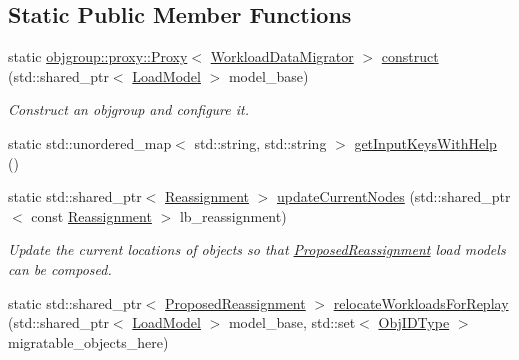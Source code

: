 \subsection*{Static Public Member Functions}
\begin{DoxyCompactItemize}
\item 
static \hyperlink{structvt_1_1objgroup_1_1proxy_1_1_proxy}{objgroup\+::proxy\+::\+Proxy}$<$ \hyperlink{structvt_1_1vrt_1_1collection_1_1balance_1_1replay_1_1_workload_data_migrator}{Workload\+Data\+Migrator} $>$ \hyperlink{structvt_1_1vrt_1_1collection_1_1balance_1_1replay_1_1_workload_data_migrator_abd44b5b51e806fadd7062bc3f482bc71}{construct} (std\+::shared\+\_\+ptr$<$ \hyperlink{structvt_1_1vrt_1_1collection_1_1balance_1_1_load_model}{Load\+Model} $>$ model\+\_\+base)
\begin{DoxyCompactList}\small\item\em Construct an objgroup and configure it. \end{DoxyCompactList}\item 
static std\+::unordered\+\_\+map$<$ std\+::string, std\+::string $>$ \hyperlink{structvt_1_1vrt_1_1collection_1_1balance_1_1replay_1_1_workload_data_migrator_afcd4cf35769f3ded24436957763921b4}{get\+Input\+Keys\+With\+Help} ()
\item 
static std\+::shared\+\_\+ptr$<$ \hyperlink{structvt_1_1vrt_1_1collection_1_1balance_1_1_reassignment}{Reassignment} $>$ \hyperlink{structvt_1_1vrt_1_1collection_1_1balance_1_1replay_1_1_workload_data_migrator_a1bfb98f8073924f31127b5b98855951b}{update\+Current\+Nodes} (std\+::shared\+\_\+ptr$<$ const \hyperlink{structvt_1_1vrt_1_1collection_1_1balance_1_1_reassignment}{Reassignment} $>$ lb\+\_\+reassignment)
\begin{DoxyCompactList}\small\item\em Update the current locations of objects so that \hyperlink{structvt_1_1vrt_1_1collection_1_1balance_1_1_proposed_reassignment}{Proposed\+Reassignment} load models can be composed. \end{DoxyCompactList}\item 
static std\+::shared\+\_\+ptr$<$ \hyperlink{structvt_1_1vrt_1_1collection_1_1balance_1_1_proposed_reassignment}{Proposed\+Reassignment} $>$ \hyperlink{structvt_1_1vrt_1_1collection_1_1balance_1_1replay_1_1_workload_data_migrator_ab90770428629d027aab515dba3333fe6}{relocate\+Workloads\+For\+Replay} (std\+::shared\+\_\+ptr$<$ \hyperlink{structvt_1_1vrt_1_1collection_1_1balance_1_1_load_model}{Load\+Model} $>$ model\+\_\+base, std\+::set$<$ \hyperlink{structvt_1_1vrt_1_1collection_1_1lb_1_1_base_l_b_a790b22acf448880599724749cdc4e9b3}{Obj\+I\+D\+Type} $>$ migratable\+\_\+objects\+\_\+here)

\end{DoxyCompactItemize}
